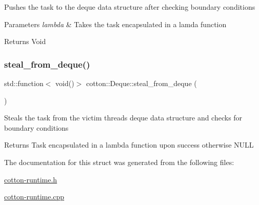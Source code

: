 Pushes the task to the deque data structure after checking boundary conditions


\begin{DoxyParams}{Parameters}
{\em lambda} & Takes the task encapsulated in a lamda function \\
\hline
\end{DoxyParams}
\begin{DoxyReturn}{Returns}
Void 
\end{DoxyReturn}
\mbox{\label{structcotton_1_1Deque_ac890b51124250fc9d179527d2d8f7799}} 
\subsubsection{\texorpdfstring{steal\+\_\+from\+\_\+deque()}{steal\_from\_deque()}}
{\footnotesize\ttfamily std\+::function$<$ void()$>$ cotton\+::\+Deque\+::steal\+\_\+from\+\_\+deque (\begin{DoxyParamCaption}{ }\end{DoxyParamCaption})}

Steals the task from the victim thread\textquotesingle{}s deque data structure and checks for boundary conditions

\begin{DoxyReturn}{Returns}
Task encapsulated in a lambda function upon success otherwise N\+U\+LL 
\end{DoxyReturn}


The documentation for this struct was generated from the following files\+:\begin{DoxyCompactItemize}
\item 
\mbox{\hyperlink{cotton-runtime_8h}{cotton-\/runtime.\+h}}\item 
\mbox{\hyperlink{cotton-runtime_8cpp}{cotton-\/runtime.\+cpp}}\end{DoxyCompactItemize}
